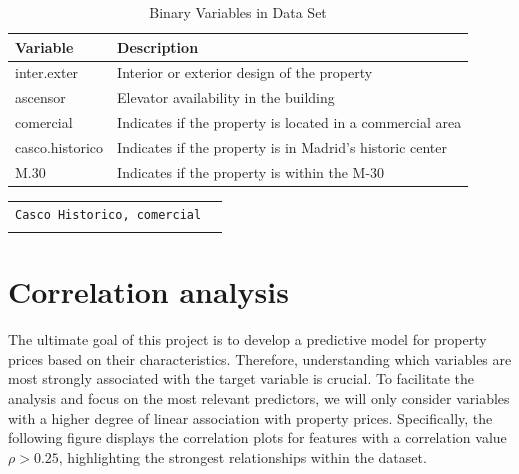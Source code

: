 \documentclass[11pt]{report} %
\begin{document}
\begin{table}[H]
\centering
\caption{Binary Variables in Data Set}
\label{tab:binary_table}
\begin{tabular}{@{}lp{10cm}@{}}
\toprule
\textbf{Variable} & \textbf{Description} \\ \midrule
inter.exter & Interior or exterior design of the property \\
ascensor & Elevator availability in the building \\
comercial & Indicates if the property is located in a commercial area \\
casco.historico & Indicates if the property is in Madrid's historic center \\
M.30 & Indicates if the property is within the M-30 \\ 
\bottomrule
\end{tabular}
\end{table}


\begin{longtable}{p{} | p{}}

    \texttt{Casco Historico, comercial} &  \\ \\
 
\end{longtable}

\textbf{}

\section{Correlation analysis}


The ultimate goal of this project is to develop a predictive model for property prices based on their characteristics. Therefore, understanding which variables are most strongly associated with the target variable is crucial. To facilitate the analysis and focus on the most relevant predictors, we will only consider variables with a higher degree of linear association with property prices. Specifically, the following figure displays the correlation plots for features with a correlation value $\rho > 0.25$, highlighting the strongest relationships within the dataset.
\end{document}

